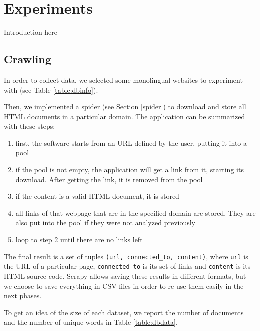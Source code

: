 \chapter{Experiments}
Introduction here

\section{Crawling}
In order to collect data, we selected some monolingual websites to experiment with (see Table \ref{table:dbinfo}).

Then, we implemented a spider (see Section \ref{spider}) to download and store all HTML documents in a particular domain.
The application can be summarized with these steps:
\begin{enumerate}[topsep=0pt, itemsep=0pt]
    \item first, the software starts from an URL defined by the user, putting it into a pool
    \item if the pool is not empty, the application will get a link from it, starting its download. After getting the link, it is removed from the pool
    \item if the content is a valid HTML document, it is stored
    \item all links of that webpage that are in the specified domain are stored. They are also put into the pool if they were not analyzed previously
    \item loop to step 2 until there are no links left
\end{enumerate}
The final result is a set of tuples \texttt{(url, connected\_to, content)}, where \texttt{url} is the URL of a particular page, \texttt{connected\_to} is its set of links and \texttt{content} is its HTML source code.
Scrapy allows saving these results in different formats, but we choose to save everything in CSV files in order to re-use them easily in the next phases.

To get an idea of the size of each dataset, we report the number of documents and the number of unique words in Table \ref{table:dbdata}.

